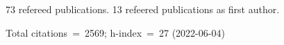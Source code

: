 73 refereed publications. 13 refeered publications as first author.

Total citations~=~2569; h-index~=~27 (2022-06-04)